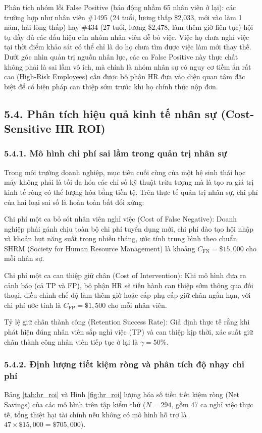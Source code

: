 \documentclass[12pt,a4paper]{article}
\begin{document}
Phân tích nhóm lỗi False Positive (báo động nhầm 65 nhân viên ở lại): các trường hợp như nhân viên \#1495 (24 tuổi, lương thấp \$2,033, mới vào làm 1 năm, hài lòng thấp) hay \#434 (27 tuổi, lương \$2,478, làm thêm giờ liên tục) hội tụ đầy đủ các dấu hiệu của nhóm nhân viên dễ bỏ việc. Việc họ chưa nghỉ việc tại thời điểm khảo sát có thể chỉ là do họ chưa tìm được việc làm mới thay thế. Dưới góc nhìn quản trị nguồn nhân lực, các ca False Positive này thực chất không phải là sai lầm vô ích, mà chính là nhóm nhân sự có nguy cơ tiềm ẩn rất cao (High-Risk Employees) cần được bộ phận HR đưa vào diện quan tâm đặc biệt để có biện pháp can thiệp sớm trước khi họ chính thức nộp đơn.

\subsection{5.4. Phân tích hiệu quả kinh tế nhân sự (Cost-Sensitive HR ROI)}

\subsubsection{5.4.1. Mô hình chi phí sai lầm trong quản trị nhân sự}
Trong môi trường doanh nghiệp, mục tiêu cuối cùng của một hệ sinh thái học máy không phải là tối đa hóa các chỉ số kỹ thuật trừu tượng mà là tạo ra giá trị kinh tế ròng có thể lượng hóa bằng tiền tệ. Trên thực tế quản trị nhân sự, chi phí của hai loại sai số là hoàn toàn bất đối xứng:

Chi phí một ca bỏ sót nhân viên nghỉ việc (Cost of False Negative): Doanh nghiệp phải gánh chịu toàn bộ chi phí tuyển dụng mới, chi phí đào tạo hội nhập và khoản hụt năng suất trong nhiều tháng, ước tính trung bình theo chuẩn SHRM (Society for Human Resource Management) là khoảng $C_{\text{FN}} = \$15{,}000$ cho mỗi nhân sự.

Chi phí một ca can thiệp giữ chân (Cost of Intervention): Khi mô hình đưa ra cảnh báo (cả TP và FP), bộ phận HR sẽ tiến hành can thiệp sớm thông qua đối thoại, điều chỉnh chế độ làm thêm giờ hoặc cấp phụ cấp giữ chân ngắn hạn, với chi phí ước tính là $C_{\text{FP}} = \$1{,}500$ cho mỗi nhân viên.

Tỷ lệ giữ chân thành công (Retention Success Rate): Giả định thực tế rằng khi phát hiện đúng nhân viên sắp nghỉ việc (TP) và can thiệp kịp thời, xác suất giữ chân thành công nhân viên tiếp tục ở lại là $\gamma = 50\%$.

\subsubsection{5.4.2. Định lượng tiết kiệm ròng và phân tích độ nhạy chi phí}
Bảng \ref{tab:hr_roi} và Hình \ref{fig:hr_roi} lượng hóa số tiền tiết kiệm ròng (Net Savings) của các mô hình trên tập kiểm thử ($N=294$, gồm 47 ca nghỉ việc thực tế, tổng thiệt hại tài chính nếu không có mô hình hỗ trợ là $47 \times \$15{,}000 = \$705{,}000$).
\end{document}
